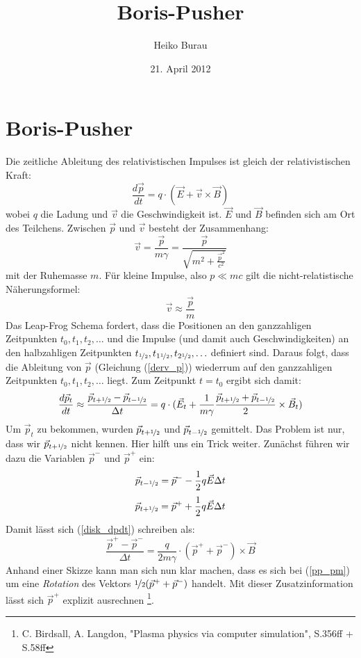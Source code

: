\documentclass[a4paper,12pt]{article}
\title{Boris-Pusher}
\author{Heiko Burau}
\date{21. April 2012}
\begin{document}
\section{Boris-Pusher}

Die zeitliche Ableitung des relativistischen Impulses ist gleich der relativistischen Kraft:
\begin{equation}
	\label{derv_p}
	\frac{d\vec{p}}{dt} = q \cdot (\vec{E} + \vec{v} \times \vec{B})
\end{equation}
wobei $q$ die Ladung und $\vec{v}$ die Geschwindigkeit ist. $\vec{E}$ und $\vec{B}$ befinden sich am Ort des Teilchens. Zwischen $\vec{p}$ und $\vec{v}$ besteht der Zusammenhang:
\begin{equation}
	\vec{v} = \frac{\vec{p}}{m \gamma} = \frac{\vec{p}}{\sqrt{m^{2} + \frac{\vec{p}^{2}}{c^{2}}}} 
\end{equation}
mit der Ruhemasse $m$. Für kleine Impulse, also $p \ll m c$ gilt die nicht-relatistische Näherungsformel:
\begin{equation}
	\vec{v} \approx \frac{\vec{p}}{m}
\end{equation}
Das Leap-Frog Schema fordert, dass die Positionen an den ganzzahligen Zeitpunkten $t_{0}, t_{1}, t_{2}, \ldots$ und die Impulse (und damit auch Geschwindigkeiten) an den halbzahligen Zeitpunkten $t_{\nicefrac{1}{2}}, t_{1\nicefrac{1}{2}}, t_{2\nicefrac{1}{2}}, \ldots$ definiert sind. Daraus folgt, dass die Ableitung von $\vec{p}$ (Gleich\-ung (\ref{derv_p})) wiederrum auf den ganzzahligen Zeitpunkten $t_{0}, t_{1}, t_{2}, \ldots$ liegt. Zum Zeitpunkt $t=t_{0}$ ergibt sich damit:
\begin{equation}
	\label{disk_dpdt}
	\frac{d\vec{p}_{t}}{dt} \approx \frac{\vec{p}_{t + \nicefrac{1}{2}} - \vec{p}_{t - \nicefrac{1}{2}}}{\Delta t}
	= q \cdot (\vec{E}_{t} + \frac{1}{m \gamma} \frac{\vec{p}_{t + \nicefrac{1}{2}} + \vec{p}_{t - \nicefrac{1}{2}}}{2} \times \vec{B}_{t} )
\end{equation}
Um $\vec{p}_{t}$ zu bekommen, wurden $\vec{p}_{t + \nicefrac{1}{2}}$ und $\vec{p}_{t - \nicefrac{1}{2}}$ gemittelt. Das Problem ist nur, dass wir $\vec{p}_{t + \nicefrac{1}{2}}$ nicht kennen. Hier hilft uns ein Trick weiter. Zunächst führen wir dazu die Variablen $\vec{p}^{-}$ und $\vec{p}^{+}$ ein:
\begin{equation}
	\vec{p}_{t - \nicefrac{1}{2}} = \vec{p}^{-} - \frac{1}{2} q \vec{E} \Delta t 
\end{equation}
\begin{equation}
	\vec{p}_{t + \nicefrac{1}{2}} = \vec{p}^{+} + \frac{1}{2} q \vec{E} \Delta t
\end{equation}
Damit lässt sich (\ref{disk_dpdt}) schreiben als:
\begin{equation}
	\label{pp_pm}
	\frac{\vec{p}^{+} - \vec{p}^{-}}{\Delta t} = \frac{q}{2 m \gamma} \cdot (\vec{p}^{+} + \vec{p}^{-}) \times \vec{B}
\end{equation}
Anhand einer Skizze kann man sich nun klar machen, dass es sich bei (\ref{pp_pm}) um eine \textit{Rotation} des Vektors $\nicefrac{1}{2}(\vec{p}^{+} + \vec{p}^{-})$ handelt. Mit dieser Zusatzinformation lässt sich $\vec{p}^{+}$ explizit ausrechnen \footnote{C. Birdsall, A. Langdon, "Plasma physics via computer simulation", S.356ff + S.58ff}.
\end{document}
